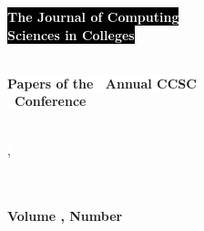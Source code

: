 \documentclass{article}
\begin{document}
\thispagestyle{empty}
\begin{textsf}

\begin{center}
\textbf{\Huge{
\colorbox{black}{\textcolor{white}{The Journal of Computing}}\\
\smallskip
\colorbox{black}{\textcolor{white}{Sciences in Colleges}}\\
}}\\
\end{center}

\vfill

\begin{center}
\textbf{\Large{
\colorbox{white}{Papers of the \confOrdinal\ Annual CCSC}\\
\colorbox{white}{\confName\ Conference}\\
}}\\
\end{center}

\vspace{10pt}

\begingroup
\centering
\colorbox{white}{\large{\confDates, \confYear}}\\
\colorbox{white}{\large{\confSchool}}\\
\colorbox{white}{\large{\confCity}}\\
\endgroup

\vspace{70pt}

{\parindent0pt
\textbf{\Large Volume \journalVolume, Number \journalNumber} \hfill
\textbf{\Large \journalMonth\ \journalYear}
}
\end{textsf}
\end{document}
